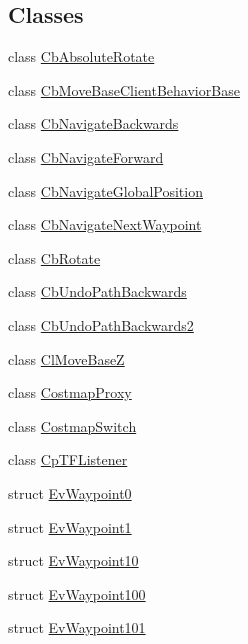 \subsection*{Classes}
\begin{DoxyCompactItemize}
\item 
class \hyperlink{classcl__move__base__z_1_1CbAbsoluteRotate}{Cb\+Absolute\+Rotate}
\item 
class \hyperlink{classcl__move__base__z_1_1CbMoveBaseClientBehaviorBase}{Cb\+Move\+Base\+Client\+Behavior\+Base}
\item 
class \hyperlink{classcl__move__base__z_1_1CbNavigateBackwards}{Cb\+Navigate\+Backwards}
\item 
class \hyperlink{classcl__move__base__z_1_1CbNavigateForward}{Cb\+Navigate\+Forward}
\item 
class \hyperlink{classcl__move__base__z_1_1CbNavigateGlobalPosition}{Cb\+Navigate\+Global\+Position}
\item 
class \hyperlink{classcl__move__base__z_1_1CbNavigateNextWaypoint}{Cb\+Navigate\+Next\+Waypoint}
\item 
class \hyperlink{classcl__move__base__z_1_1CbRotate}{Cb\+Rotate}
\item 
class \hyperlink{classcl__move__base__z_1_1CbUndoPathBackwards}{Cb\+Undo\+Path\+Backwards}
\item 
class \hyperlink{classcl__move__base__z_1_1CbUndoPathBackwards2}{Cb\+Undo\+Path\+Backwards2}
\item 
class \hyperlink{classcl__move__base__z_1_1ClMoveBaseZ}{Cl\+Move\+BaseZ}
\item 
class \hyperlink{classcl__move__base__z_1_1CostmapProxy}{Costmap\+Proxy}
\item 
class \hyperlink{classcl__move__base__z_1_1CostmapSwitch}{Costmap\+Switch}
\item 
class \hyperlink{classcl__move__base__z_1_1CpTFListener}{Cp\+T\+F\+Listener}
\item 
struct \hyperlink{structcl__move__base__z_1_1EvWaypoint0}{Ev\+Waypoint0}
\item 
struct \hyperlink{structcl__move__base__z_1_1EvWaypoint1}{Ev\+Waypoint1}
\item 
struct \hyperlink{structcl__move__base__z_1_1EvWaypoint10}{Ev\+Waypoint10}
\item 
struct \hyperlink{structcl__move__base__z_1_1EvWaypoint100}{Ev\+Waypoint100}
\item 
struct \hyperlink{structcl__move__base__z_1_1EvWaypoint101}{Ev\+Waypoint101}
\item 

\end{DoxyCompactItemize}
